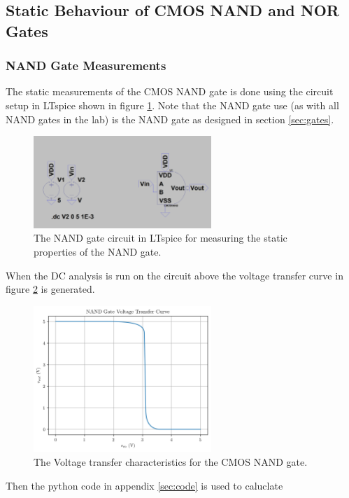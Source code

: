 \documentclass[titlepage, 12pt]{article}
\begin{document}
    \subsection{Static Behaviour of CMOS NAND and NOR Gates}
    \subsubsection{NAND Gate Measurements}
    The static measurements of the CMOS NAND gate is done using the
    circuit setup in LTspice shown in figure \ref{fig:part_21_NAND}.
    Note that the NAND gate use (as with all NAND gates in the lab) is
    the NAND gate as designed in section \ref{sec:gates}.
    \begin{figure}[H]
        \centering
        \includegraphics[width=0.6\textwidth]{figures/part_21_NAND_circuit.png}
        \caption{The NAND gate circuit in LTspice for measuring the
        static properties of the NAND gate.}
        \label{fig:part_21_NAND}
    \end{figure}
    When the DC analysis is run on the circuit above the voltage
    transfer curve in figure \ref{fig:NAND_VTC} is generated.
    \begin{figure}[H]
        \centering
        \includegraphics[width=0.6\textwidth]{figures/part_21_NAND.png}
        \caption{The Voltage transfer characteristics for the CMOS NAND
        gate.}
        \label{fig:NAND_VTC}
    \end{figure}
    Then the python code in appendix \ref{sec:code} is used to caluclate
\end{document}
